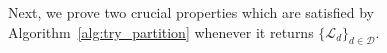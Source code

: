 Next, we prove two crucial properties which are satisfied by Algorithm~\ref{alg:try_partition} whenever it returns $\{\mathcal{L}_{d}\}_{d\in  \mathcal{D} }$.
